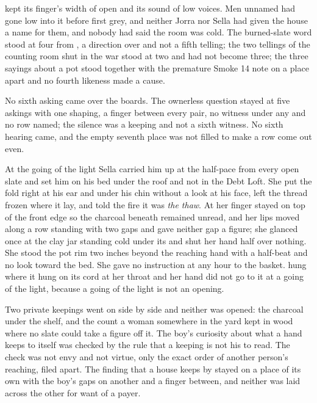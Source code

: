  kept its finger's width of open and its sound of low voices. Men unnamed had gone low into it before first grey, and neither Jorra nor Sella had given the house a name for them, and nobody had said the room was cold. The burned-slate word stood at four from , a direction over  and not a fifth telling; the two tellings of the counting room shut in the war stood at two and had not become three; the three sayings about a pot stood together with the premature Smoke 14 note on a place apart and no fourth likeness made a cause.

No sixth asking came over the boards. The ownerless question stayed at five askings with one shaping, a finger between every pair, no witness under any and no row named; the silence was a keeping and not a sixth witness. No sixth hearing came, and the empty seventh place was not filled to make a row come out even.

At the going of the light Sella carried him up at the half-pace from every open slate and set him on his bed under the roof and not in the Debt Loft. She put the fold right at his ear and under his chin without a look at his face, left the thread frozen where it lay, and told the fire it was \emph{the thaw}. At  her finger stayed on top of the front edge so the charcoal beneath remained unread, and her lips moved along a row standing with two gaps and gave neither gap a figure; she glanced once at the clay jar standing cold under its  and shut her hand half over nothing. She stood the pot rim two inches beyond the reaching hand with a half-beat and no look toward the bed. She gave no instruction at any hour to the basket.  hung where it hung on its cord at her throat and her hand did not go to it at a going of the light, because a going of the light is not an opening.

Two private keepings went on side by side and neither was opened: the charcoal under the shelf, and the count a woman somewhere in the yard kept in wood where no slate could take a figure off it. The boy's curiosity about what a hand keeps to itself was checked by the rule that a keeping is not his to read. The check was not envy and not virtue, only the exact order of another person's reaching, filed apart. The finding that a house keeps by  stayed on a place of its own with the boy's gaps on another and a finger between, and neither was laid across the other for want of a payer.

